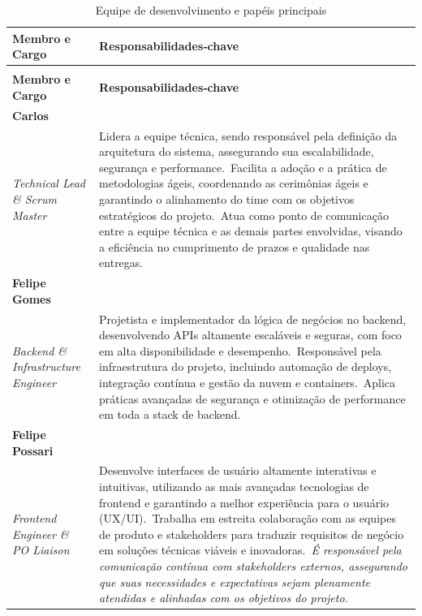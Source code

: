 \documentclass[a4paper, 12pt]{article}
\begin{document}
\begin{longtable}[c]{@{} >{\raggedright\arraybackslash}p{4.5cm} >{\raggedright\arraybackslash}p{11cm} @{}}
  \caption{Equipe de desenvolvimento e papéis principais} \\
  \toprule
  \textbf{Membro e Cargo} & \textbf{Responsabilidades‑chave} \\
  \midrule
\endfirsthead

\multicolumn{2}{@{}l}{\textbf{Continuação da página anterior}} \\
  \toprule
  \textbf{Membro e Cargo} & \textbf{Responsabilidades‑chave} \\
  \midrule
\endhead

\bottomrule
\endfoot

\textbf{Carlos} \\ \textit{Technical Lead \& Scrum Master} &
  Lidera a equipe técnica, sendo responsável pela definição da arquitetura do sistema, assegurando sua escalabilidade, segurança e performance.\
  Facilita a adoção e a prática de metodologias ágeis, coordenando as cerimônias ágeis e garantindo o alinhamento do time com os objetivos estratégicos do projeto.\
  Atua como ponto de comunicação entre a equipe técnica e as demais partes envolvidas, visando a eficiência no cumprimento de prazos e qualidade nas entregas. \\

\textbf{Felipe Gomes} \\ \textit{Backend \& Infrastructure Engineer} &
  Projetista e implementador da lógica de negócios no backend, desenvolvendo APIs altamente escaláveis e seguras, com foco em alta disponibilidade e desempenho.\
  Responsável pela infraestrutura do projeto, incluindo automação de deploys, integração contínua e gestão da nuvem e containers.\
  Aplica práticas avançadas de segurança e otimização de performance em toda a stack de backend. \\

\textbf{Felipe Possari} \\ \textit{Frontend Engineer \& PO Liaison} &
  Desenvolve interfaces de usuário altamente interativas e intuitivas, utilizando as mais avançadas tecnologias de frontend e garantindo a melhor experiência para o usuário (UX/UI).\
  Trabalha em estreita colaboração com as equipes de produto e stakeholders para traduzir requisitos de negócio em soluções técnicas viáveis e inovadoras.\
  \textit{É responsável pela comunicação contínua com stakeholders externos, assegurando que suas necessidades e expectativas sejam plenamente atendidas e alinhadas com os objetivos do projeto.} \\


\end{longtable}
\end{document}
